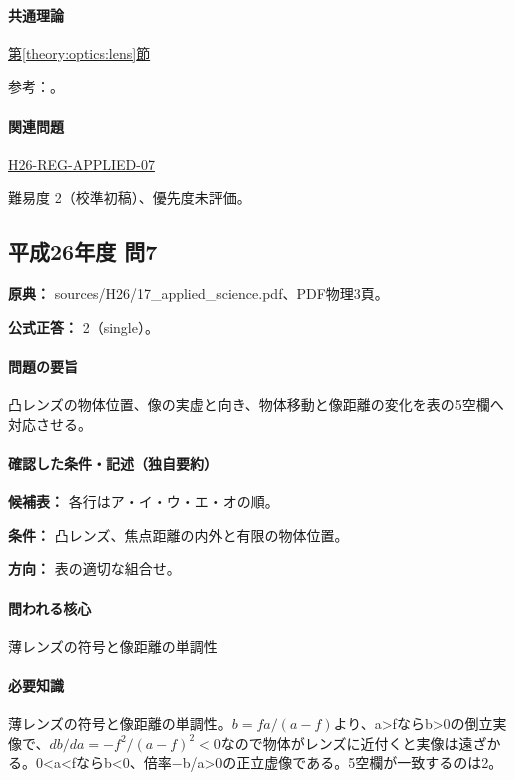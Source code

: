 \paragraph{共通理論} \hyperref[theory:optics:lens]{第\ref*{theory:optics:lens}節}

\par 参考：\cite{os_lens}。

\paragraph{関連問題} \hyperref[q:h26-reg-applied-07]{H26-REG-APPLIED-07}

\par 難易度 2（校準初稿）、優先度未評価。

\subsection{平成26年度 問7}
\label{q:h26-reg-applied-07}

\noindent\textbf{原典：} sources/H26/17\_applied\_science.pdf、PDF物理3頁。

\textbf{公式正答：} 2（single）。

\paragraph{問題の要旨} 凸レンズの物体位置、像の実虚と向き、物体移動と像距離の変化を表の5空欄へ対応させる。

\paragraph{確認した条件・記述（独自要約）}\mbox{}\par

\noindent\textbf{候補表：} 各行はア・イ・ウ・エ・オの順。\par

\noindent\textbf{条件：} 凸レンズ、焦点距離の内外と有限の物体位置。\par

\noindent\textbf{方向：} 表の適切な組合せ。\par

\paragraph{問われる核心} 薄レンズの符号と像距離の単調性

\paragraph{必要知識} 薄レンズの符号と像距離の単調性。\(b=fa/(a-f)\)より、a>fならb>0の倒立実像で、\(db/da=-f^2/(a-f)^2<0\)なので物体がレンズに近付くと実像は遠ざかる。0<a<fならb<0、倍率−b/a>0の正立虚像である。5空欄が一致するのは2。

